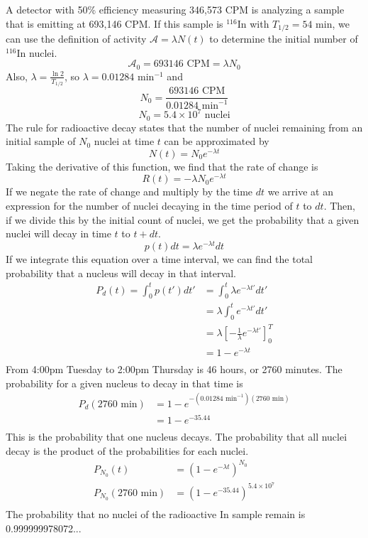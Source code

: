 \documentclass{article}
\begin{document}
A detector with 50\% efficiency measuring 346,573 CPM is analyzing a sample that is emitting at 693,146 CPM. If this sample is $^{116}$In with $T_{1/2} = 54$ min, we can use the definition of activity $\mathcal{A} = \lambda N(t)$ to determine the initial number of $^{116}$In nuclei. 
$$ \mathcal{A_0} = 693146 \text{ CPM} = \lambda N_0 $$
Also, $\lambda = \frac{\ln 2}{T_{1/2}}$, so $\lambda = 0.01284$ min$^{-1}$ and
$$ N_0 = \frac{693146\text{ CPM}}{0.01284\text{ min}^{-1}} $$
$$ N_0 = 5.4 \times 10^7 \text{ nuclei} $$
The rule for radioactive decay states that the number of nuclei remaining from an initial sample of $N_0$ nuclei at time $t$ can be approximated by
$$ N(t) = N_0 e^{-\lambda t} $$
Taking the derivative of this function, we find that the rate of change is 
$$ R(t) = -\lambda N_0 e^{-\lambda t} $$
If we negate the rate of change and multiply by the time $dt$ we arrive at an expression for the number of nuclei decaying in the time period of $t$ to $dt$. Then, if we divide this by the initial count of nuclei, we get the probability that a given nuclei will decay in time $t$ to $t+dt$. 
$$ p(t)dt = \lambda e^{-\lambda t} dt $$
If we integrate this equation over a time interval, we can find the total probability that a nucleus will decay in that interval.
\begin{align*}
P_d(t) = \int_0^t p(t')dt'	&= \int_0^t \lambda e^{-\lambda t'} dt'\\
							&= \lambda \int_0^t e^{-\lambda t'} dt'\\
							&= \lambda \left[ -\frac{1}{\lambda} e^{-\lambda t'} \right]_0^T\\
							&= 1 - e^{-\lambda t} \\
\end{align*}
From 4:00pm Tuesday to 2:00pm Thursday is 46 hours, or 2760 minutes. The probability for a given nucleus to decay in that time is
\begin{align*}
P_d(2760\text{ min})	&= 1-e^{-(0.01284 \text{ min}^{-1})(2760\text{ min})} \\ 
					&= 1-e^{-35.44} \\
\end{align*}
This is the probability that one nucleus decays. The probability that all nuclei decay is the product of the probabilities for each nuclei.
\begin{align*} 
P_{N_0}(t)					&= (1 - e^{-\lambda t})^{N_0} \\
P_{N_0}(2760\text{ min})	&= (1- e^{-35.44})^{5.4\times10^7} \\
\end {align*}
The probability that no nuclei of the radioactive In sample remain is 0.999999978072...
\end{document}

